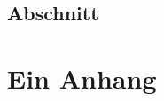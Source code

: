 \documentclass[bibtotoc,halfparskip,oneside]{scrreprt}
\begin{document}
\lipsum[1-3]

\section{Abschnitt}

\lipsum[1-3]

\appendix\chapter{Ein Anhang}

\lipsum

 
\end{document}
